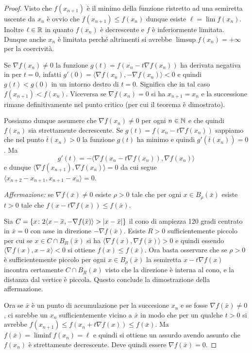 \begin{proof}
Visto che $f(x_{n+1})$ è il minimo della funzione ristretto 
ad una semiretta uscente da $x_n$ è ovvio che $f(x_{n+1})\le f(x_n)$
dunque esiste $\ell = \lim f(x_n)$. 
Inoltre $\ell\in {\mathbb R}$ in quanto $f(x_n)$ è decrescente e $f$ è inferiormente 
limitata.
Dunque anche $x_n$ è limitata perché altrimenti si avrebbe $\limsup f(x_n)=+\infty$ 
per la coercività.

Se $\nabla f(x_n)\neq 0$ la funzione
$g(t) = f(x_n - t \nabla f(x_n))$ 
ha derivata negativa in per $t=0$, infatti 
$g'(0) = \langle \nabla f(x_n), -\nabla f(x_n)\rangle < 0$
e quindi $g(t)<g(0)$ in un intorno destro di $t=0$.
Significa che in tal caso $f(x_{n+1}) < f(x_n)$.
Viceversa se $\nabla f(x_n)=0$ si ha $x_{n+1}=x_n$ e la successione
rimane definitivamente nel punto critico (per cui il teorema è dimostrato).

Possiamo dunque assumere che $\nabla f(x_n)\neq 0$ per ogni $n\in {\mathbb N}$ 
e che quindi $f(x_n)$ sia strettamente decrescente.
Se $g(t) = f(x_n - t \nabla f(x_n))$
sappiamo che nel punto $\bar t(x_n)>0$ la funzione $g(t)$
ha minimo e quindi $g'(\bar t(x_n))=0$.
Ma
\[
  g'(t) 
    = - \langle \nabla f(x_n - t\nabla f(x_n)), \nabla f(x_n)\rangle
\]
e dunque $\langle \nabla f(x_{n+1}), \nabla f(x_n)\rangle=0$
da cui segue $\langle x_{n+2} - x_{n+1}, x_{n+1}-x_n\rangle=0$.

\emph{Affermazione:}
se $\nabla f(\bar x)\neq 0$ esiste $\rho>0$
tale che per ogni $x\in B_\rho(\bar x)$ 
esiste $t>0$ tale che $f(x-t\nabla f(x)) \le f(\bar x)$.

Sia $C={\left\{ x\colon 2\langle x-\bar x,-\nabla f(\bar x)\rangle > {\left|x-\bar x\right|} \right\}}$ il cono 
di ampiezza 120 gradi centrato in $\bar x=0$ con asse in direzione $-\nabla f(\bar x)$.
Esiste $R>0$ sufficientemente piccolo per cui 
se $x\in C\cap B_R(\bar x)$ si ha $\langle \nabla f(x),\nabla f(\bar x)\rangle >0$
e quindi essendo $\langle \nabla f(x),x-\bar x\rangle < 0$
si ottiene $f(x) \le f(\bar x)$.
Ora basta osservare che se $\rho>0$ è sufficientemente piccolo 
per ogni $x\in B_\rho(\bar x)$ la semiretta $x - t \nabla f(x)$
incontra certamente $C\cap B_R(\bar x)$ visto che la direzione 
è interna al cono, e la distanza dal vertice è piccola. 
Questo conclude la dimostrazione della affermazione.

Ora se $\bar x$ è un punto di accumulazione per la succesione $x_n$ 
e se fosse $\nabla f(\bar x)\neq 0$,
ci sarebbe un $x_n$ sufficientemente vicino a $\bar x$ in modo che 
per un qualche $t>0$ si avrebbe $f(x_{n+1})\le f(x_n+t \nabla f(x)) \le f(\bar x)$.
Ma $f(\bar x) = \liminf f(x_n) = \ell$ e quindi si ottiene un assurdo 
avendo assunto che $f(x_n)$ è strettamente decrescente.
Deve quindi essere $\nabla f(\bar x) = 0$.
\end{proof}
